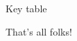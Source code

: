 \documentclass[answers,addpoints]{exam}
\begin{document}
\begin{questions}

\end{questions}

\hrulefill

Key table

\printkeytable[1-30]\quad\printkeytable[31-60]\quad\printkeytable[61-83]

\writekeylist{\mykeylist}

\savekeylist[\yesthekeylist]

{\color{red}\ttfamily\yesthekeylist}

That's all folks!
\end{document}
